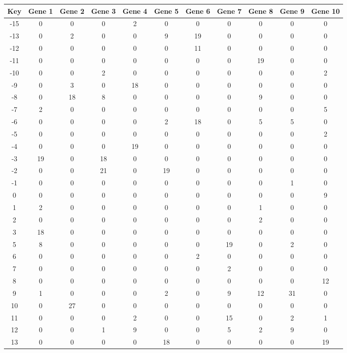 \begin{tabular}{|c|c|c|c|c|c|c|c|c|c|c|}
\hline
Key & Gene 1 & Gene 2 & Gene 3 & Gene 4 & Gene 5 & Gene 6 & Gene 7 & Gene 8 & Gene 9 & Gene 10 \\
\hline
-15 & 0 & 0 & 0 & 2 & 0 & 0 & 0 & 0 & 0 & 0 \\
-13 & 0 & 2 & 0 & 0 & 9 & 19 & 0 & 0 & 0 & 0 \\
-12 & 0 & 0 & 0 & 0 & 0 & 11 & 0 & 0 & 0 & 0 \\
-11 & 0 & 0 & 0 & 0 & 0 & 0 & 0 & 19 & 0 & 0 \\
-10 & 0 & 0 & 2 & 0 & 0 & 0 & 0 & 0 & 0 & 2 \\
-9 & 0 & 3 & 0 & 18 & 0 & 0 & 0 & 0 & 0 & 0 \\
-8 & 0 & 18 & 8 & 0 & 0 & 0 & 0 & 9 & 0 & 0 \\
-7 & 2 & 0 & 0 & 0 & 0 & 0 & 0 & 0 & 0 & 5 \\
-6 & 0 & 0 & 0 & 0 & 2 & 18 & 0 & 5 & 5 & 0 \\
-5 & 0 & 0 & 0 & 0 & 0 & 0 & 0 & 0 & 0 & 2 \\
-4 & 0 & 0 & 0 & 19 & 0 & 0 & 0 & 0 & 0 & 0 \\
-3 & 19 & 0 & 18 & 0 & 0 & 0 & 0 & 0 & 0 & 0 \\
-2 & 0 & 0 & 21 & 0 & 19 & 0 & 0 & 0 & 0 & 0 \\
-1 & 0 & 0 & 0 & 0 & 0 & 0 & 0 & 0 & 1 & 0 \\
0 & 0 & 0 & 0 & 0 & 0 & 0 & 0 & 0 & 0 & 9 \\
1 & 2 & 0 & 0 & 0 & 0 & 0 & 0 & 1 & 0 & 0 \\
2 & 0 & 0 & 0 & 0 & 0 & 0 & 0 & 2 & 0 & 0 \\
3 & 18 & 0 & 0 & 0 & 0 & 0 & 0 & 0 & 0 & 0 \\
5 & 8 & 0 & 0 & 0 & 0 & 0 & 19 & 0 & 2 & 0 \\
6 & 0 & 0 & 0 & 0 & 0 & 2 & 0 & 0 & 0 & 0 \\
7 & 0 & 0 & 0 & 0 & 0 & 0 & 2 & 0 & 0 & 0 \\
8 & 0 & 0 & 0 & 0 & 0 & 0 & 0 & 0 & 0 & 12 \\
9 & 1 & 0 & 0 & 0 & 2 & 0 & 9 & 12 & 31 & 0 \\
10 & 0 & 27 & 0 & 0 & 0 & 0 & 0 & 0 & 0 & 0 \\
11 & 0 & 0 & 0 & 2 & 0 & 0 & 15 & 0 & 2 & 1 \\
12 & 0 & 0 & 1 & 9 & 0 & 0 & 5 & 2 & 9 & 0 \\
13 & 0 & 0 & 0 & 0 & 18 & 0 & 0 & 0 & 0 & 19 \\
\hline
\end{tabular}